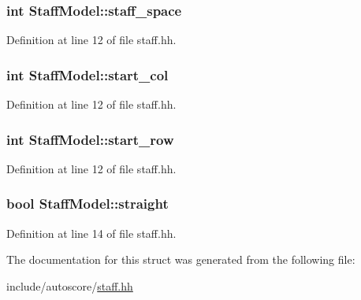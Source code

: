 \subsubsection[{\texorpdfstring{staff\+\_\+space}{staff_space}}]{\setlength{\rightskip}{0pt plus 5cm}int Staff\+Model\+::staff\+\_\+space}\hypertarget{structStaffModel_a64ddccbd4d416dba382ae9f4f9bbe7fc}{}\label{structStaffModel_a64ddccbd4d416dba382ae9f4f9bbe7fc}


Definition at line 12 of file staff.\+hh.

\subsubsection[{\texorpdfstring{start\+\_\+col}{start_col}}]{\setlength{\rightskip}{0pt plus 5cm}int Staff\+Model\+::start\+\_\+col}\hypertarget{structStaffModel_a0d40c0261502458fa794f81f7a39ffef}{}\label{structStaffModel_a0d40c0261502458fa794f81f7a39ffef}


Definition at line 12 of file staff.\+hh.

\subsubsection[{\texorpdfstring{start\+\_\+row}{start_row}}]{\setlength{\rightskip}{0pt plus 5cm}int Staff\+Model\+::start\+\_\+row}\hypertarget{structStaffModel_a116b56bb5fb2a12531ea020a5c93f9a7}{}\label{structStaffModel_a116b56bb5fb2a12531ea020a5c93f9a7}


Definition at line 12 of file staff.\+hh.

\subsubsection[{\texorpdfstring{straight}{straight}}]{\setlength{\rightskip}{0pt plus 5cm}bool Staff\+Model\+::straight}\hypertarget{structStaffModel_aa3c9a53c181ac34279101f3aaa15f1e6}{}\label{structStaffModel_aa3c9a53c181ac34279101f3aaa15f1e6}


Definition at line 14 of file staff.\+hh.



The documentation for this struct was generated from the following file\+:\begin{DoxyCompactItemize}
\item 
include/autoscore/\hyperlink{staff_8hh}{staff.\+hh}\end{DoxyCompactItemize}
